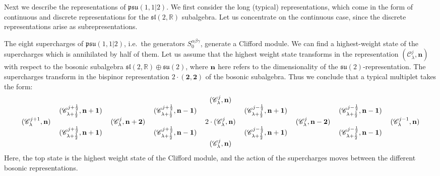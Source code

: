 \documentclass[12pt,a4paper]{article}
\newcommand{\be}{\begin{equation}}
\newcommand{\ee}{\end{equation}}
\begin{document}
Next we describe the representations of $\mathfrak{psu}(1,1|2)$. We first consider the 
long (typical) representations, which come in the form of continuous and discrete representations for the $\mathfrak{sl}(2,\mathds{R})$ subalgebra. Let us concentrate on the continuous case, since the discrete representations arise as subrepresentations.

The eight supercharges of $\mathfrak{psu}(1,1|2)$, i.e.\ the generators $S^{\alpha\beta\gamma}_0$, 
generate a Clifford module. We can find a highest-weight state of the supercharges which is annihilated by half of them. Let us assume that the highest weight state transforms in the representation $(\mathscr{C}^j_\lambda,\mathbf{n})$ with respect to the bosonic subalgebra $\mathfrak{sl}(2,\mathds{R}) \oplus \mathfrak{su}(2)$, where  ${\bf n}$ here refers to the dimensionality of the $\mathfrak{su}(2)$-representation. The supercharges transform in the bispinor representation $2\cdot (\mathbf{2},\mathbf{2})$ of the bosonic subalgebra. Thus we conclude that a typical multiplet takes the form:
\begingroup
\setlength{\tabcolsep}{-.7em}
\be 
\begin{tabular}{ccccccccc}
& & & & $(\mathscr{C}^{j}_\lambda,\mathbf{n})$ & & & & \\
& $(\mathscr{C}^{j+\frac{1}{2}}_{\lambda+\frac{1}{2}},\mathbf{n+1})$ & & $(\mathscr{C}^{j+\frac{1}{2}}_{\lambda+\frac{1}{2}},\mathbf{n-1})$ & & $(\mathscr{C}^{j-\frac{1}{2}}_{\lambda+\frac{1}{2}},\mathbf{n+1})$ & & $(\mathscr{C}^{j-\frac{1}{2}}_{\lambda+\frac{1}{2}},\mathbf{n-1})$ & \\
$(\mathscr{C}^{j+1}_{\lambda},\mathbf{n})$ & & $(\mathscr{C}^{j}_{\lambda},\mathbf{n+2})$& & $2 \cdot (\mathscr{C}^{j}_{\lambda},\mathbf{n})$& & $(\mathscr{C}^{j}_{\lambda},\mathbf{n-2})$ & & $(\mathscr{C}^{j-1}_{\lambda},\mathbf{n})$ \\
& $(\mathscr{C}^{j+\frac{1}{2}}_{\lambda+\frac{1}{2}},\mathbf{n+1})$ & & $(\mathscr{C}^{j+\frac{1}{2}}_{\lambda+\frac{1}{2}},\mathbf{n-1})$ & & $(\mathscr{C}^{j-\frac{1}{2}}_{\lambda+\frac{1}{2}},\mathbf{n+1})$ & & $(\mathscr{C}^{j-\frac{1}{2}}_{\lambda+\frac{1}{2}},\mathbf{n-1})$ & \\
& & & & $(\mathscr{C}^{j}_\lambda,\mathbf{n})$ & & & & \label{eq:long representation}
\end{tabular} 
\ee
Here, the top state is the highest weight state of the Clifford module, and the action of the supercharges moves between the different bosonic representations.
\end{document}
